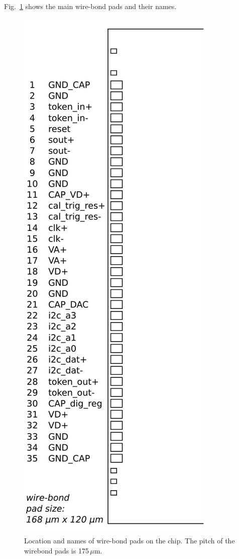Fig.~\ref{fig:ROCpadschematic} shows the main wire-bond pads and their names. 

\begin{figure}[hbtp]
	\begin{center}
	\includegraphics[width=.3\textwidth]{img/ROC_padschema.pdf}
	\end{center}
	\caption{Location and names of wire-bond pads on the chip. The pitch of the wirebond pads is 175\,$\mu$m.}
	\label{fig:ROCpadschematic}
\end{figure}

